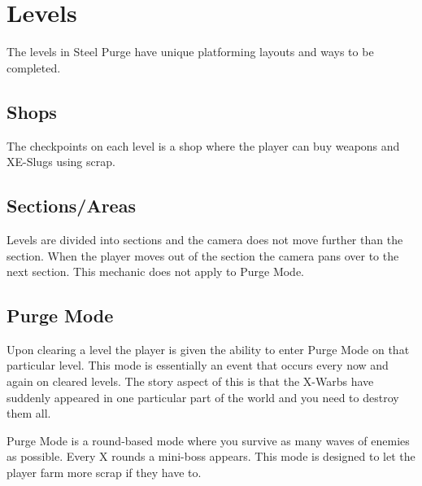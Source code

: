 \documentclass[../Main.tex]{subfiles}
\begin{document}
\section{Levels}

The levels in Steel Purge have unique platforming layouts and ways to be completed.

\subsection{Shops}

The checkpoints on each level is a shop where the player can buy weapons and XE-Slugs using scrap.

\subsection{Sections/Areas}

Levels are divided into sections and the camera does not move further than the section. When the player moves out of the section the camera pans over to the next section. This mechanic does not apply to Purge Mode.

\subsection{Purge Mode}

Upon clearing a level the player is given the ability to enter Purge Mode on that particular level. This mode is essentially an event that occurs every now and again on cleared levels. The story aspect of this is that the X-Warbs have suddenly appeared in one particular part of the world and you need to destroy them all.

Purge Mode is a round-based mode where you survive as many waves of enemies as possible. Every X rounds a mini-boss appears. This mode is designed to let the player farm more scrap if they have to.
\end{document}
